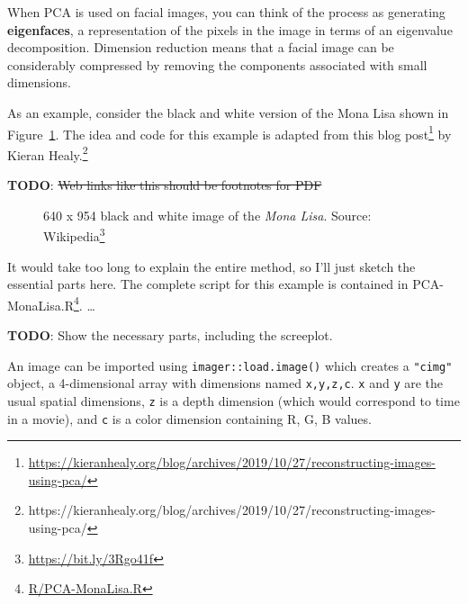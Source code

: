 \documentclass[
  letterpaper,
  10pt,
  krantz2]{krantz}
\providecommand{\href}[2]{#2\footnote{\url{#1}}}
\begin{document}
When PCA is used on facial images, you can think of the process as
generating \textbf{eigenfaces}, a representation of the pixels in the
image in terms of an eigenvalue decomposition. Dimension reduction means
that a facial image can be considerably compressed by removing the
components associated with small dimensions.

As an example, consider the black and white version of the Mona Lisa
shown in Figure~\ref{fig-MonaLisa}. The idea and code for this example
is adapted from this
\href{https://kieranhealy.org/blog/archives/2019/10/27/reconstructing-images-using-pca/}{blog
post} by Kieran Healy.\footnote{https://kieranhealy.org/blog/archives/2019/10/27/reconstructing-images-using-pca/}

\textbf{TODO}: \st{Web links like this should be footnotes for PDF}

\begin{figure}


\caption{\label{fig-MonaLisa}640 x 954 black and white image of the
\emph{Mona Lisa}. Source: \href{https://bit.ly/3Rgo41f}{Wikipedia}}

\end{figure}%

It would take too long to explain the entire method, so I'll just sketch
the essential parts here. The complete script for this example is
contained in \href{R/PCA-MonaLisa.R}{PCA-MonaLisa.R}. \ldots{}

\textbf{TODO}: Show the necessary parts, including the screeplot.

An image can be imported using \texttt{imager::load.image()} which
creates a \texttt{"cimg"} object, a 4-dimensional array with dimensions
named \texttt{x,y,z,c}. \texttt{x} and \texttt{y} are the usual spatial
dimensions, \texttt{z} is a depth dimension (which would correspond to
time in a movie), and \texttt{c} is a color dimension containing R, G, B
values.
\end{document}
